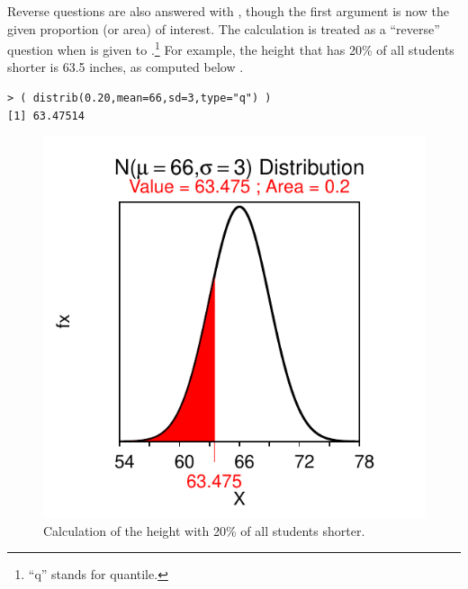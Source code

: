 \documentclass[10pt,openany]{book}\usepackage[]{graphicx}\usepackage[]{color}
\makeatletter
\newenvironment{kframe}{%
 \def\at@end@of@kframe{}%
 \ifinner\ifhmode%
  \def\at@end@of@kframe{\end{minipage}}%
  \begin{minipage}{\columnwidth}%
 \fi\fi%
 \def\FrameCommand##1{\hskip\@totalleftmargin \hskip-\fboxsep
 \colorbox{shadecolor}{##1}\hskip-\fboxsep
     \hskip-\linewidth \hskip-\@totalleftmargin \hskip\columnwidth}%
 \MakeFramed {\advance\hsize-\width
   \@totalleftmargin\z@ \linewidth\hsize
   \@setminipage}}%
 {\par\unskip\endMakeFramed%
 \at@end@of@kframe}
\newenvironment{knitrout}{}{} %
\makeatother
\begin{document}
Reverse questions are also answered with , though the first argument is now the given proportion (or area) of interest. The calculation is treated as a ``reverse'' question when  is given to .\footnote{``q'' stands for quantile.}  For example, the height that has 20\% of all students shorter is  63.5 inches, as computed below .
\begin{knitrout}
\color{fgcolor}\begin{kframe}
\begin{verbatim}
> ( distrib(0.20,mean=66,sd=3,type="q") )
[1] 63.47514
\end{verbatim}
\end{kframe}\begin{figure}[hbtp]

{\centering \includegraphics[width=.4\linewidth]{Figs/NormZCalc4-1} 

}

\caption[Calculation of the height with 20\% of all students shorter]{Calculation of the height with 20\% of all students shorter.}\label{fig:NormZCalc4}
\end{figure}


\end{knitrout}
\end{document}
